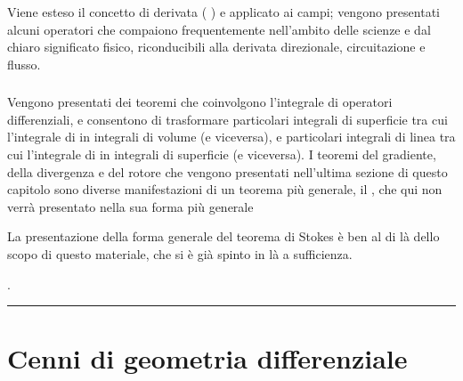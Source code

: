 \documentclass[letterpaper,10pt,italian]{jupyterBook}
\begin{document}
\sphinxAtStartPar
Viene esteso il concetto di derivata ( ) e applicato ai campi; vengono presentati alcuni operatori che compaiono frequentemente nell’ambito delle scienze e dal chiaro significato fisico, riconducibili alla derivata direzionale, circuitazione e flusso.
\subsubsection*{}

\sphinxAtStartPar
Vengono presentati dei teoremi che coinvolgono l’integrale di operatori differenziali, e consentono di trasformare particolari integrali di superficie \sphinxhyphen{} tra cui l’integrale di  \sphinxhyphen{} in integrali di volume (e viceversa), e particolari integrali di linea \sphinxhyphen{} tra cui l’integrale di  \sphinxhyphen{} in integrali di superficie (e viceversa). I teoremi del gradiente, della divergenza e del rotore che vengono presentati nell’ultima sezione di questo capitolo  sono diverse manifestazioni di un teorema più generale, il , che qui non verrà presentato nella sua forma più generale%
\begin{footnote}[1]\sphinxAtStartFootnote
La presentazione della forma generale del teorema di Stokes è ben al di là dello scopo di questo materiale, che si è già spinto in là a sufficienza.
%
\end{footnote}.




\bigskip\hrule\bigskip


\sphinxstepscope


\section{Cenni di geometria differenziale}
\label{\detokenize{ch/vector-calculus/geometry:cenni-di-geometria-differenziale}}\label{\detokenize{ch/vector-calculus/geometry:vector-calculus-geometry}}\label{\detokenize{ch/vector-calculus/geometry::doc}}
\end{document}
